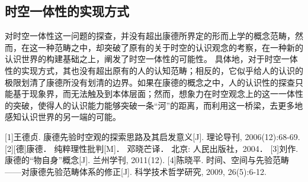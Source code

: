 \documentclass[lang=cn,11pt]{elegantpaper}
\begin{document}
\subsection{时空一体性的实现方式}
对时空一体性这一问题的探查，并没有超出康德所界定的形而上学的概念范畴，然而，在这一种范畴之中，却突破了原有的关于时空的认识观念的考察，在一种新的认识世界的构建基础之上，阐发了时空一体性的可能性。
具体地，对于时空一体性的实现方式，其也没有超出原有的人的认知范畴；相反的，它似乎给人的认识的极限划清了康德所没有划清的边界。如果在康德的概念之中，人的认识性的探查只能基于现象界，而无法触及到本体层面；然而，想象力在时空观念上的这一一体性的突破，使得人的认识能力能够突破一条“河”的距离，而利用这一桥梁，去更多地感知认识世界的另一端的可能。
\begin{thebibliography}{1}

  [1]王德贞. 康德先验时空观的探索思路及其启发意义[J]. 理论导刊, 2006(12):68-69.
  \bibitem{}[2][德]康德． 纯粹理性批判[M]． 邓晓芒译． 北京: 人民出版社，2004．
  \bibitem{}[3]刘作. 康德的“物自身”概念[J]. 兰州学刊, 2011(12).
  \bibitem{}[4]陈晓平. 时间、空间与先验范畴——对康德先验范畴体系的修正[J]. 科学技术哲学研究, 2009, 26(5):6-12.

\end{thebibliography}
    
  
\end{document}
